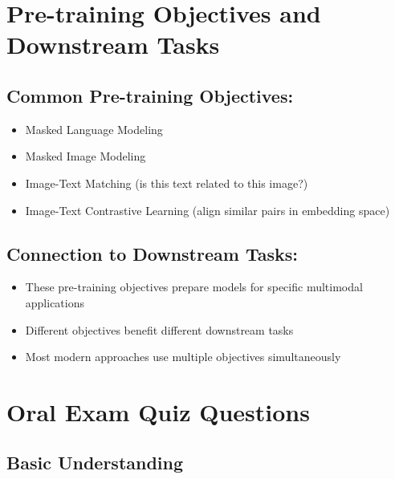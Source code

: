 \section*{Pre-training Objectives and Downstream Tasks}

\subsection*{Common Pre-training Objectives:}
\begin{itemize}
    \item Masked Language Modeling
    \item Masked Image Modeling
    \item Image-Text Matching (is this text related to this image?)
    \item Image-Text Contrastive Learning (align similar pairs in embedding space)
\end{itemize}

\subsection*{Connection to Downstream Tasks:}
\begin{itemize}
    \item These pre-training objectives prepare models for specific multimodal applications
    \item Different objectives benefit different downstream tasks
    \item Most modern approaches use multiple objectives simultaneously
\end{itemize}
\section*{Oral Exam Quiz Questions}

\subsection*{Basic Understanding}

